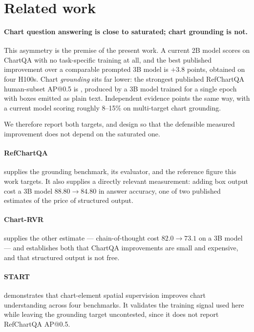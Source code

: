 \section{Related work}
\label{sec:related}

\paragraph{Chart question answering is close to saturated; chart grounding is not.}
This asymmetry is the premise of the present work. A current 2B model scores  on
ChartQA with no task-specific training at all, and the best published improvement over a comparable
prompted 3B model is $+3.8$ points, obtained on four H100s. Chart \emph{grounding} sits far lower:
the strongest published RefChartQA human-subset AP@0.5 is , produced by a 3B model
trained for a single epoch with boxes emitted as plain text. Independent evidence points the same
way, with a current model scoring roughly 8--15\% on multi-target chart grounding.

We therefore report both targets, and design so that the defensible measured improvement does not
depend on the saturated one.

\paragraph{RefChartQA} supplies the grounding benchmark, its evaluator, and the reference figure this
work targets. It also supplies a directly relevant measurement: adding box output cost a 3B model
$88.80 \rightarrow 84.80$ in answer accuracy, one of two published estimates of the price of
structured output.

\paragraph{Chart-RVR} supplies the other estimate --- chain-of-thought cost $82.0 \rightarrow 73.1$
on a 3B model --- and establishes both that ChartQA improvements are small and expensive, and that
structured output is not free.

\paragraph{START} demonstrates that chart-element spatial supervision improves chart understanding
across four benchmarks. It validates the training signal used here while leaving the grounding
target uncontested, since it does not report RefChartQA AP@0.5.

